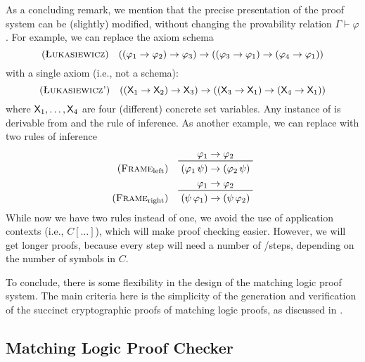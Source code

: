 \documentclass{article}
\begin{document}
As a concluding remark, we mention that the precise presentation of
the proof system can be (slightly) modified, without changing the provability relation $\Gamma \vdash \varphi$. 
For example, 
we can replace the \pruleLuk axiom schema
\[
\pruleLuk
\quad
((\varphi_1 \imp \varphi_2) \imp \varphi_3) 
   \imp ((\varphi_3 \imp \varphi_1) \imp (\varphi_4 \imp \varphi_1))
\]
with a single axiom (i.e., not a schema):
\[
\prule{Łukasiewicz'}
\quad
((\cvX_1 \imp \cvX_2) \imp \cvX_3) 
   \imp ((\cvX_3 \imp \cvX_1) \imp (\cvX_4 \imp \cvX_1))
\]
where $\cvX_1,\dots,\cvX_4$ are four (different) concrete set variables. 
Any instance of \pruleLuk is derivable from 
and the \pruleSubst rule of inference. 
As another example, we can replace
\pruleFrame with two rules of inference
\begin{align*}
\pruleFrameL\quad
  & \prftree{\varphi_1 \imp \varphi_2}
            {(\varphi_1 \, \psi) \imp (\varphi_2 \, \psi)}
\\
\pruleFrameR\quad
  & \prftree{\varphi_1 \imp \varphi_2}
            {(\psi \, \varphi_1) \imp (\psi \, \varphi_2)}
\end{align*}
While now we have two rules instead of one, 
we avoid the use of application contexts (i.e., $C[\dots]$),
which will make proof checking easier. 
However, we will get longer proofs, because every \pruleFrame step
will need a number of \pruleFrameL/\pruleFrameL steps,
depending on the number of symbols in $C$. 

To conclude, there is some flexibility in the design of the matching logic proof system. 
The main criteria here is the simplicity of the generation and verification
of the succinct cryptographic proofs of matching logic proofs,
as discussed in . 

\subsection{Matching Logic Proof Checker}
\label{sec:ml_proof_checker}
\end{document}
